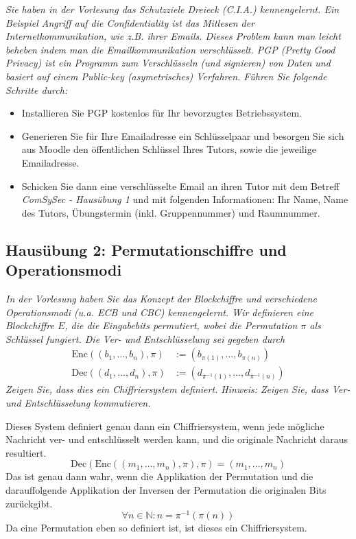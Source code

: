\documentclass[
  ngerman,
  DIV=12
]{scrartcl}
\begin{document}
\itshape Sie haben in der Vorlesung das Schutzziele Dreieck (C.I.A.) kennengelernt. Ein Beispiel Angriff auf die Confidentiality ist das Mitlesen der Internetkommunikation, wie z.B. ihrer Emails. Dieses Problem kann man leicht beheben indem man die Emailkommunikation verschlüsselt. PGP (Pretty Good Privacy) ist ein Programm zum Verschlüsseln (und signieren) von Daten und basiert auf einem Public-key (asymetrisches) Verfahren. Führen Sie folgende Schritte durch:
\begin{itemize}
\item Installieren Sie PGP kostenlos für Ihr bevorzugtes Betriebssystem.
\item Generieren Sie für Ihre Emailadresse ein Schlüsselpaar und besorgen Sie sich aus Moodle den öffentlichen Schlüssel Ihres Tutors, sowie die jeweilige Emailadresse.
\item Schicken Sie dann eine verschlüsselte Email an ihren Tutor mit dem Betreff \emph{ComSySec - Hausübung 1} und mit folgenden Informationen: Ihr Name, Name des Tutors, Übungstermin (inkl. Gruppennummer) und Raumnummer.  
\end{itemize}\upshape

\subsection*{Hausübung 2: Permutationschiffre und Operationsmodi}

\emph{In der Vorlesung haben Sie das Konzept der Blockchiffre und verschiedene Operationsmodi (u.a. ECB und CBC) kennengelernt. Wir definieren eine Blockchiffre $E$, die die Eingabebits permutiert, wobei die Permutation $\pi$ als Schlüssel fungiert. Die Ver- und Entschlüsselung sei gegeben durch}
\begin{align*}
\mathrm{Enc}((b_1,\dots,b_n),\pi) &:= (b_{\pi(1)},\dots,b_{\pi(n)})\\
\mathrm{Dec}((d_1,\dots,d_n),\pi) &:= (d_{\pi^{-1}(1)},\dots,d_{\pi^{-1}(n)})  
\end{align*}
\emph{Zeigen Sie, dass dies ein Chiffriersystem definiert. Hinweis: Zeigen Sie, dass Ver- und Entschlüsselung kommutieren.}

\medskip\noindent
Dieses System definiert genau dann ein Chiffriersystem, wenn jede mögliche Nachricht ver- und entschlüsselt werden kann, und die originale Nachricht daraus resultiert.
\begin{equation*}
\mathrm{Dec}(\mathrm{Enc}((m_1, \dots, m_n), \pi), \pi) = (m_1, \dots, m_n)
\end{equation*}
Das ist genau dann wahr, wenn die Applikation der Permutation und die darauffolgende Applikation der Inversen der Permutation die originalen Bits zurückgibt. 
\begin{equation*}
\forall n \in \mathbb{N} : n = \pi^{-1}(\pi(n))  
\end{equation*}
Da eine Permutation eben so definiert ist, ist dieses ein Chiffriersystem.
\end{document}
